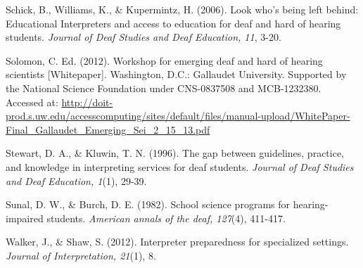 \documentclass[11.5pt]{sig-alternate} %
\begin{document}
Schick, B., Williams, K., \& Kupermintz, H. (2006). Look who’s being left behind: Educational Interpreters and access to education for deaf and hard of hearing students. \textit{Journal of Deaf Studies and Deaf Education, 11}, 3-20.

Solomon, C. Ed. (2012). Workshop for emerging deaf and hard of hearing scientists [Whitepaper]. Washington, D.C.: Gallaudet University. Supported by the National Science Foundation under CNS-0837508 and MCB-1232380. Accessed at: \url{http://doit-prod.s.uw.edu/accesscomputing/sites/default/files/manual-upload/WhitePaper-Final_Gallaudet_Emerging_Sei_2_15_13.pdf}

Stewart, D. A., \& Kluwin, T. N. (1996). The gap between guidelines, practice, and knowledge in interpreting services for deaf students. \textit{Journal of Deaf Studies and Deaf Education, 1}(1), 29-39.

Sunal, D. W., \& Burch, D. E. (1982). School science programs for hearing-impaired students. \textit{American annals of the deaf, 127}(4), 411-417.

Walker, J., \& Shaw, S. (2012). Interpreter preparedness for specialized settings. \textit{Journal of Interpretation, 21}(1), 8.
\end{document}
